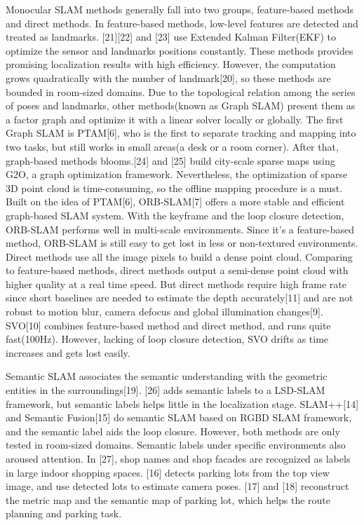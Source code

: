 \documentclass[journal]{IEEEtran}
\begin{document}
Monocular SLAM methods generally fall into two groups, feature-based methods and direct methods. In feature-based methods, low-level features are detected and treated as landmarks. [21][22] and [23] use Extended Kalman Filter(EKF) to optimize the sensor and landmarks positions constantly. These methods provides promising localization results with high efficiency. However, the computation grows quadratically with the number of landmark[20], so these methods are bounded in room-sized domains. Due to the topological relation among the series of poses and landmarks, other methods(known as Graph SLAM) present them as a factor graph and optimize it with a linear solver locally or globally. The first Graph SLAM is PTAM[6], who is the first to separate tracking and mapping into two tasks, but still works in small areas(a desk or a room corner). After that, graph-based methods blooms.[24] and [25] build city-scale sparse maps using G2O, a graph optimization framework. Nevertheless, the optimization of sparse 3D point cloud is time-consuming, so the offline mapping procedure is a must. Built on the idea of PTAM[6], ORB-SLAM[7] offers a more stable and efficient graph-based SLAM system. With the keyframe and the loop closure detection, ORB-SLAM performs well in multi-scale environments. Since it’s a feature-based method, ORB-SLAM is still easy to get lost in less or non-textured environments. Direct methods use all the image pixels to build a dense point cloud. Comparing to feature-based methods, direct methods output a semi-dense point cloud with higher quality at a real time speed. But direct methods require high frame rate since short baselines are needed to estimate the depth accurately[11] and are not robust to motion blur, camera defocus and global illumination changes[9]. SVO[10] combines feature-based method and direct method, and runs quite fast(100Hz). However, lacking of loop closure detection, SVO drifts as time increases and gets lost easily.
	
Semantic SLAM associates the semantic understanding with the geometric entities in the surroundings[19]. [26] adds semantic labels to a LSD-SLAM framework, but semantic labels helps little in the localization stage. SLAM++[14] and Semantic Fusion[15] do semantic SLAM based on RGBD SLAM framework, and the semantic label aids the loop closure. However, both methods are only tested in room-sized domains. Semantic labels under specific environments also aroused attention. In [27], shop names and shop facades are recognized as labels in large indoor shopping spaces. [16] detects parking lots from the top view image, and use detected lots to estimate camera poses. [17] and [18] reconstruct the metric map and the semantic map of parking lot, which helps the route planning and parking task.
\end{document}
